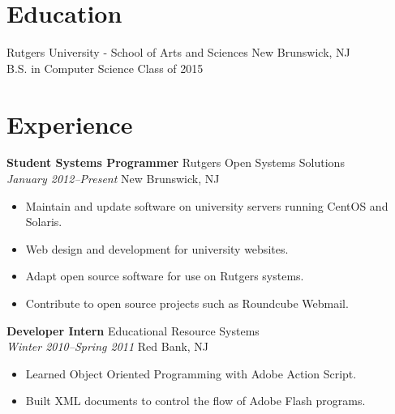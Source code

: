 \documentclass[margin]{res}
\begin{document}
 
 
 
\address{{\bf Present Address } \\ 2112 LPO Way \\ Piscataway, NJ 08854  \\
        phone : (732) 403 4073 }
\address{{\bf Permanent Address} \\ 153 Riveredge Road \\ Tinton Falls, NJ 07724\\
		email : jmatthews492@gmail.com \\ github : jmatth}

\begin{resume} 
 
\section{Education} 

Rutgers University - School of Arts and Sciences \hfill New Brunswick, NJ\\
B.S. in Computer Science \hfill Class of 2015

\section{Experience}

{\bf Student Systems Programmer} \hfill Rutgers Open Systems Solutions\\
\textit{January 2012--Present} \hfill New Brunswick, NJ
\begin{itemize} \itemsep -2pt %
	\item Maintain and update software on university servers running CentOS and Solaris.
	\item Web design and development for university websites.
	\item Adapt open source software for use on Rutgers systems.
	\item Contribute to open source projects such as Roundcube Webmail.
\end{itemize}

{\bf Developer Intern} \hfill Educational Resource Systems\\
\textit{Winter 2010--Spring 2011} \hfill  Red Bank, NJ
\begin{itemize} \itemsep -2pt %
	\item Learned Object Oriented Programming with Adobe Action Script.
	\item Built XML documents to control the flow of Adobe Flash programs.
\end{itemize}


\end{resume}
\end{document}
